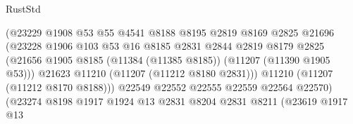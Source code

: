 \begin{lexlean}{RustStd}
\begin{coremodule}
                                          (@23229
                                            @1908
                                            @53
                                            @55
                                            @4541
                                            @8188
                                            @8195
                                            @2819
                                            @8169
                                            @2825
                                            @21696
                                            (@23228
                                              @1906
                                              @103
                                              @53
                                              @16
                                              @8185
                                              @2831
                                              @2844
                                              @2819
                                              @8179
                                              @2825
                                              (@21656
                                                @1905
                                                @8185
                                                (@11384 (@11385 @8185))
                                                (@11207 (@11390 @1905 @53)))
                                              @21623
                                              @11210
                                              (@11207 (@11212 @8180 @2831)))
                                            @11210
                                            (@11207 (@11212 @8170 @8188)))
                                          @22549
                                          @22552
                                          @22555
                                          @22559
                                          @22564
                                          @22570)
                                        (@23274
                                          @8198
                                          @1917
                                          @1924
                                          @13
                                          @2831
                                          @8204
                                          @2831
                                          @8211
                                          (@23619
                                            @1917
                                            @13

\end{coremodule}
\end{lexlean}
